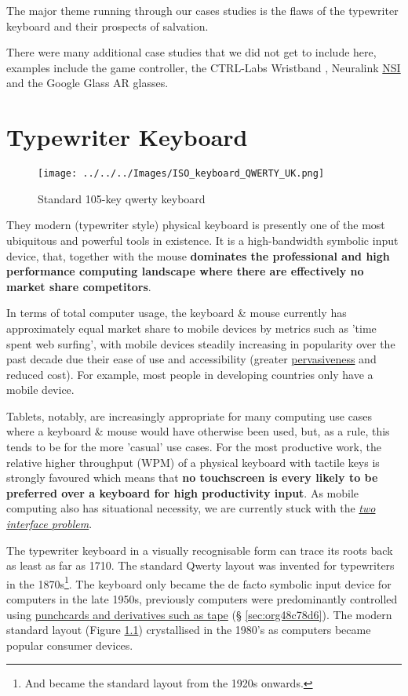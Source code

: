 \documentclass[logo,bsc,singlespacing,parskip]{infthesis}
\begin{document}
The major theme running through our cases studies is the flaws of the typewriter keyboard and their prospects of salvation.

There were many additional case studies that we did not get to include here, examples include the game controller, the CTRL-Labs Wristband \autocite{27CTRLlabsLinkedIn}, Neuralink \hyperref[org79fc546]{NSI} \autocite{muskNeuralink} and the Google Glass AR glasses.
\chapter{Typewriter Keyboard}
\label{sec:orgf282b8b}
\begin{figure}[h]
\centering
\texttt{[image: ../../../Images/ISO\_keyboard\_QWERTY\_UK.png]}
\caption{\label{fig:stand_keyb}Standard 105-key qwerty keyboard}
\end{figure}

They modern (typewriter style) physical keyboard is presently one of the most ubiquitous and powerful tools in existence.
It is a high-bandwidth symbolic input device, that, together with the mouse \textbf{dominates the professional and high performance computing landscape where there are effectively no market share competitors}.

In terms of total computer usage, the keyboard \& mouse currently has approximately equal market share to mobile devices by metrics such as 'time spent web surfing', with mobile devices steadily increasing in popularity over the past decade due their ease of use and accessibility (greater \hyperref[pervasiveness]{pervasiveness} and reduced cost).
For example, most people in developing countries only have a mobile device.

Tablets, notably, are increasingly appropriate for many computing use cases where a keyboard \& mouse would have otherwise been used, but, as a rule, this tends to be for the more 'casual' use cases.
For the most productive work, the relative higher throughput (WPM) of a physical keyboard with tactile keys is strongly favoured which means that \textbf{no touchscreen is every likely to be preferred over a keyboard for high productivity input}.
As mobile computing also has situational necessity, we are currently stuck with the \emph{\hyperref[two interface problem]{two interface problem}}.

The typewriter keyboard in a visually recognisable form can trace its roots back as least as far as 1710.
The standard Qwerty layout was invented for typewriters in the 1870s\footnote{And became the standard layout from the 1920s onwards.}.
The keyboard only became the de facto symbolic input device for computers in the late 1950s, previously computers were predominantly controlled using \hyperref[sec:org48c78d6]{punchcards and derivatives such as tape} (§ \ref{sec:org48c78d6}).
The modern standard layout (Figure \ref{fig:stand_keyb}) crystallised in the 1980's as computers became popular consumer devices.
\end{document}
